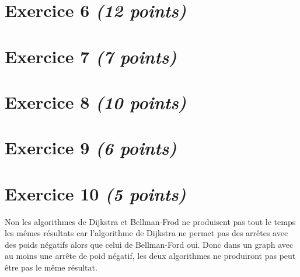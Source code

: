 \documentclass{article}
\begin{document}
\clearpage

\section{Exercice 6 \emph{(12 points)}}

\clearpage

\section{Exercice 7 \emph{(7 points)}}

\clearpage

\section{Exercice 8 \emph{(10 points)}}

\clearpage

\section{Exercice 9 \emph{(6 points)}}

\clearpage

\section{Exercice 10 \emph{(5 points)}}

Non les algorithmes de Dijkstra et Bellman-Frod ne produisent pas tout le temps les mêmes résultats car l'algorithme de Dijkstra ne permet pas des arrêtes avec des poids négatifs alors que celui de Bellman-Ford oui. Donc dans un graph avec au moins une arrête de poid négatif, les deux algorithmes ne produiront pas peut être pas le même résultat.
\end{document}
